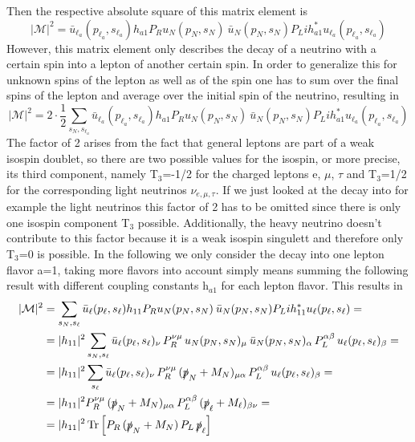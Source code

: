 Then the respective absolute square of this matrix element is 
\begin{equation*}
|\mathcal{M}|^2=\bar{u}_{\ell_a}(p_{\ell_a},s_{\ell_a})h_{a1}P_Ru_N(p_N,s_N)\:\bar{u}_{N}(p_{N},s_{N})P_Lih^*_{a1}u_{\ell_a}(p_{\ell_a},s_{\ell_a})
\end{equation*} \newline
However, this matrix element only describes the decay of a neutrino with a certain spin into a lepton of another certain spin. In order to generalize this for unknown spins of the lepton as well as of the spin one has to sum over the final spins of the lepton and average over the initial spin of the neutrino, resulting in
\begin{equation*}
|\mathcal{M}|^2=2\cdot\frac{1}{2}\sum_{s_N,s_{\ell_a}}\bar{u}_{\ell_a}(p_{\ell_a},s_{\ell_a})h_{a1}P_Ru_N(p_N,s_N)\:\bar{u}_{N}(p_{N},s_{N})P_Lih^*_{a1}u_{\ell_a}(p_{\ell_a},s_{\ell_a})
\end{equation*}
The factor of 2 arises from the fact that general leptons are part of a weak isospin doublet, so there are two possible values for the isospin, or more precise, its third component, namely T$_3$=-1/2 for the charged leptons e, $\mu$, $\tau$ and T$_3$=1/2 for the corresponding light neutrinos $\nu_{e,\mu,\tau}$. If we just looked at the decay into for example the light neutrinos this factor of 2 has to be omitted since there is only one isospin component T$_3$ possible. Additionally, the heavy neutrino doesn't contribute to this factor because it is a weak isospin singulett and therefore only T$_3$=0 is possible. \newline
In the following we only consider the decay into one lepton flavor a=1, taking more flavors into account simply means summing the following result with different coupling constants h$_{a1}$ for each lepton flavor. This results in
\begin{align*}
|\mathcal{M}|^2&=\sum_{s_N,s_{\ell}}\bar{u}_{\ell}(p_{\ell},s_{\ell})h_{11}P_Ru_N(p_N,s_N)\:\bar{u}_{N}(p_{N},s_{N})P_Lih^*_{11}u_{\ell}(p_{\ell},s_{\ell})=\\
&=|h_{11}|^2\sum_{s_N,s_{\ell}}\bar{u}_{\ell}(p_{\ell},s_{\ell})_\nu\, P_R^{\nu\mu}\,u_N(p_N,s_N)_\mu\:\bar{u}_{N}(p_{N},s_{N})_\alpha\, P_L^{\alpha\beta}\,u_{\ell}(p_{\ell},s_{\ell})_\beta=\\
&=|h_{11}|^2\sum_{s_{\ell}}\bar{u}_{\ell}(p_{\ell},s_{\ell})_\nu\, P_R^{\nu\mu}\,(\slashed p_N+M_N)_{\mu\alpha}\, P_L^{\alpha\beta}\,u_{\ell}(p_{\ell},s_{\ell})_\beta=\\
&=|h_{11}|^2P_R^{\nu\mu}\,(\slashed p_N+M_N)_{\mu\alpha}\, P_L^{\alpha\beta}\,(\slashed p_\ell+M_\ell)_{\beta\nu}=\\
&=|h_{11}|^2\,\text{Tr}\left[P_R\,(\slashed p_N+M_N)\, P_L\,\slashed p_\ell\right]
\end{align*}
